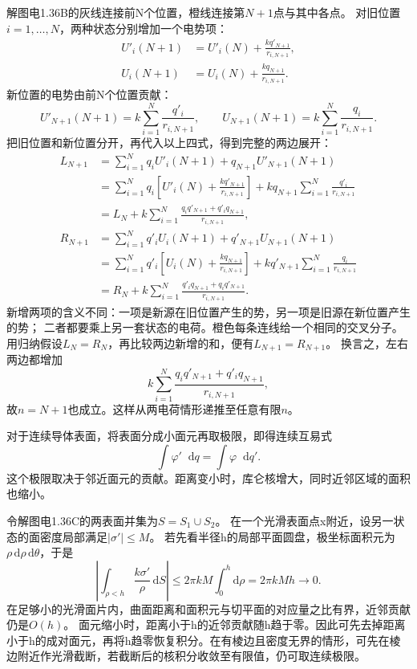 \documentclass[UTF8,fontset=fandol,a4paper,11pt]{ctexart}
\newcommand{\dd}{\mathop{}\!\mathrm{d}}
\begin{document}
解图电1.36B的灰线连接前N个位置，橙线连接第$N+1$点与其中各点。
对旧位置$i=1,\ldots,N$，两种状态分别增加一个电势项：
\[
\begin{aligned}
U'_i(N+1)&=U'_i(N)+\frac{kq'_{N+1}}{r_{i,N+1}},\\
U_i(N+1)&=U_i(N)+\frac{kq_{N+1}}{r_{i,N+1}} .
\end{aligned}
\]
新位置的电势由前N个位置贡献：
\[
U'_{N+1}(N+1)=k\sum_{i=1}^N\frac{q'_i}{r_{i,N+1}},\qquad
U_{N+1}(N+1)=k\sum_{i=1}^N\frac{q_i}{r_{i,N+1}} .
\]
把旧位置和新位置分开，再代入以上四式，得到完整的两边展开：
\[
\begin{aligned}
L_{N+1}
&=\sum_{i=1}^{N}q_iU'_i(N+1)+q_{N+1}U'_{N+1}(N+1)\\
&=\sum_{i=1}^{N}q_i
 \left[U'_i(N)+\frac{kq'_{N+1}}{r_{i,N+1}}\right]
 +kq_{N+1}\sum_{i=1}^{N}\frac{q'_i}{r_{i,N+1}}\\
&=L_N+k\sum_{i=1}^{N}
 \frac{q_iq'_{N+1}+q'_iq_{N+1}}{r_{i,N+1}},\\[4pt]
R_{N+1}
&=\sum_{i=1}^{N}q'_iU_i(N+1)+q'_{N+1}U_{N+1}(N+1)\\
&=\sum_{i=1}^{N}q'_i
 \left[U_i(N)+\frac{kq_{N+1}}{r_{i,N+1}}\right]
 +kq'_{N+1}\sum_{i=1}^{N}\frac{q_i}{r_{i,N+1}}\\
&=R_N+k\sum_{i=1}^{N}
 \frac{q'_iq_{N+1}+q_iq'_{N+1}}{r_{i,N+1}} .
\end{aligned}
\]
新增两项的含义不同：一项是新源在旧位置产生的势，另一项是旧源在新位置产生的势；
二者都要乘上另一套状态的电荷。橙色每条连线给一个相同的交叉分子。
用归纳假设$L_N=R_N$，再比较两边新增的和，便有$L_{N+1}=R_{N+1}$。
换言之，左右两边都增加
\[k\sum_{i=1}^N\frac{q_iq'_{N+1}+q'_iq_{N+1}}{r_{i,N+1}},\]
故$n=N+1$也成立。这样从两电荷情形递推至任意有限$n$。

对于连续导体表面，将表面分成小面元再取极限，即得连续互易式
\[\int\varphi'\dd q=\int\varphi\dd q'.\]
这个极限取决于邻近面元的贡献。距离变小时，库仑核增大，同时近邻区域的面积也缩小。

令解图电1.36C的两表面并集为$S=S_1\cup S_2$。
在一个光滑表面点x附近，设另一状态的面密度局部满足$|\sigma'|\le M$。
若先看半径h的局部平面圆盘，极坐标面积元为$\rho\,\mathrm d\rho\,\mathrm d\theta$，于是
\[
\left|\int_{\rho<h}\frac{k\sigma'}{\rho}\,\mathrm dS\right|
\le 2\pi kM\int_0^h\mathrm d\rho=2\pi kMh\longrightarrow0 .
\]
在足够小的光滑面片内，曲面距离和面积元与切平面的对应量之比有界，近邻贡献仍是$O(h)$。
面元缩小时，距离小于h的近邻贡献随h趋于零。因此可先去掉距离小于h的成对面元，再将h趋零恢复积分。在有棱边且密度无界的情形，可先在棱边附近作光滑截断，若截断后的核积分收敛至有限值，仍可取连续极限。
\end{document}
